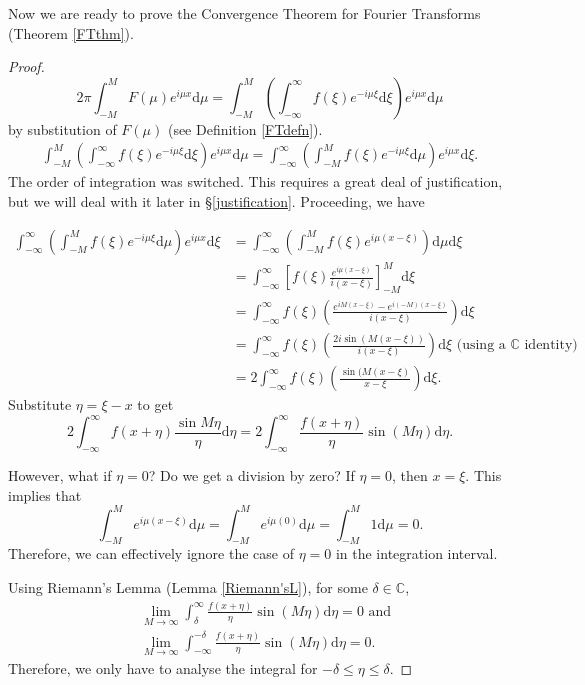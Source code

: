 Now we are ready to prove the Convergence Theorem for Fourier Transforms (Theorem \ref{FTthm}).
\begin{proof}
$$2\pi\int_{-M}^{M}F(\mu)e^{i\mu x}\mathrm{d}\mu = \int_{-M}^{M}\left(\int_{-\infty}^{\infty}f(\xi)e^{-i\mu\xi}\mathrm{d}\xi\right) e^{i\mu x}\mathrm{d}\mu$$
by substitution of $F(\mu)$ (see Definition \ref{FTdefn}).
\begin{align}
\int_{-M}^{M}\left(\int_{-\infty}^{\infty}f(\xi)e^{-i\mu\xi}\mathrm{d}\xi\right) e^{i\mu x}\mathrm{d}\mu = \int_{-\infty}^{\infty}\left(\int_{-M}^{M}f(\xi)e^{-i\mu\xi}\mathrm{d}\mu \right) e^{i\mu x} \mathrm{d}\xi. \label{interchange}
\end{align}
The order of integration was switched. This requires a great deal of justification, but we will deal with it later in \S\ref{justification}. Proceeding, we have

\begin{align*}
    \int_{-\infty}^{\infty}\left(\int_{-M}^{M}f(\xi)e^{-i\mu\xi}\mathrm{d}\mu \right) e^{i\mu x} \mathrm{d}\xi &= \int_{-\infty}^{\infty}\left(\int_{-M}^{M}f(\xi)e^{i\mu(x-\xi)}\right)\mathrm{d}\mu \mathrm{d}\xi \\
    &= \int_{-\infty}^{\infty}\left[f(\xi)\frac{e^{i\mu(x-\xi)}}{i(x-\xi)}\right]_{-M}^{M}\mathrm{d}\xi \\
    &= \int_{-\infty}^{\infty}f(\xi)\left(\frac{e^{i M(x-\xi)} - e^{i(-M)(x-\xi)}}{i(x-\xi)}\right)\mathrm{d}\xi \\
    &= \int_{-\infty}^{\infty}f(\xi)\left(\frac{2i\sin(M(x-\xi))}{i(x-\xi)}\right)\mathrm{d}\xi \mbox{ (using a $\mathbb{C}$ identity)}\\
    &= 2\int_{-\infty}^{\infty}f(\xi)\left(\frac{\sin(M(x-\xi)}{x-\xi}\right)\mathrm{d}\xi.
\end{align*}
Substitute $\eta = \xi - x$ to get
$$2\int_{-\infty}^{\infty}f(x + \eta)\frac{\sin M \eta}{\eta}\mathrm{d}\eta = 2\int_{-\infty}^{\infty}\frac{f(x + \eta)}{\eta}\sin (M \eta)\mathrm{d}\eta.$$

However, what if $\eta = 0$? Do we get a division by zero? If $\eta = 0$, then $x = \xi$. This implies that 
$$\int_{-M}^{M}e^{i\mu(x-\xi)}\mathrm{d}\mu = \int_{-M}^{M}e^{i\mu(0)}\mathrm{d}\mu = \int_{-M}^{M}1\mathrm{d}\mu = 0.$$
Therefore, we can effectively ignore the case of $\eta = 0$ in the integration interval.

Using Riemann's Lemma (Lemma \ref{Riemann'sL}), for some $\delta \in \mathbb{C}$,
\begin{align*}
&\lim_{M\rightarrow\infty}\int_{\delta}^{\infty}\frac{f(x + \eta)}{\eta}\sin (M \eta)\mathrm{d}\eta = 0 \mbox{ and} \\
&\lim_{M\rightarrow\infty}\int_{-\infty}^{-\delta}\frac{f(x + \eta)}{\eta}\sin (M \eta)\mathrm{d}\eta = 0.
\end{align*} \pause
Therefore, we only have to analyse the integral for $-\delta \leq \eta \leq \delta$.


\end{proof}
